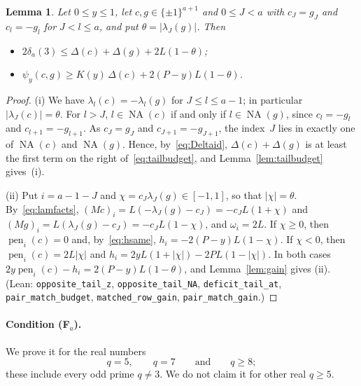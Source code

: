 \documentclass[11pt]{article}
\newtheorem{lemma}[theorem]{Lemma}
\theoremstyle{remark}
\newcommand{\NA}{\operatorname{NA}}
\begin{document}
\begin{lemma}\label{lem:pair}
Let $0\le y\le1$, let $c,g\in\{\pm1\}^{a+1}$ and $0\le J<a$ with $c_J=g_J$ and
$c_l=-g_l$ for $J<l\le a$, and put $\theta=|\lambda_J(g)|$. Then
\begin{itemize}
\item[(i)] $2\delta_a(3)\le\Delta(c)+\Delta(g)+2L(1-\theta)$;
\item[(ii)] $\psi_y(c,g)\ge K(y)\,\Delta(c)+2(P-y)L(1-\theta)$.
\end{itemize}
\end{lemma}
\begin{proof}
(i) We have $\lambda_l(c)=-\lambda_l(g)$ for $J\le l\le a-1$; in particular
$|\lambda_J(c)|=\theta$. For $l>J$, $l\in\NA(c)$ if and only if $l\in\NA(g)$, since
$c_l=-g_l$ and $c_{l+1}=-g_{l+1}$. As $c_J=g_J$ and $c_{J+1}=-g_{J+1}$, the
index~$J$ lies in exactly one of $\NA(c)$ and $\NA(g)$. Hence, by~\eqref{eq:Deltaid},
$\Delta(c)+\Delta(g)$ is at least the first term on the right
of~\eqref{eq:tailbudget}, and Lemma~\ref{lem:tailbudget} gives~(i).

(ii) Put $i=a-1-J$ and $\chi=c_J\lambda_J(g)\in[-1,1]$, so that $|\chi|=\theta$.
By~\eqref{eq:lamfacts}, $(Mc)_i=L(-\lambda_J(g)-c_J)=-c_JL(1+\chi)$ and
$(Mg)_i=L(\lambda_J(g)-c_J)=-c_JL(1-\chi)$, and $\omega_i=2L$. If $\chi\ge0$, then
$\operatorname{pen}_i(c)=0$ and, by~\eqref{eq:hsame},
$h_i=-2(P-y)L(1-\chi)$. If $\chi<0$, then $\operatorname{pen}_i(c)=2L|\chi|$ and
$h_i=2yL(1+|\chi|)-2PL(1-|\chi|)$. In both cases
$2y\operatorname{pen}_i(c)-h_i=2(P-y)L(1-\theta)$, and Lemma~\ref{lem:gain} gives
(ii). (Lean: \texttt{opposite\_tail\_z}, \texttt{opposite\_tail\_NA},
\texttt{deficit\_tail\_at}, \texttt{pair\_match\_budget},
\texttt{matched\_row\_gain}, \texttt{pair\_match\_gain}.)
\end{proof}

\paragraph{Condition (F$_a$).} We prove it for the real numbers
\[
q=5,\qquad q=7\qquad\text{and}\qquad q\ge8;
\]
these include every odd prime $q\ne3$. We do not claim it for other real $q\ge5$.
\end{document}
